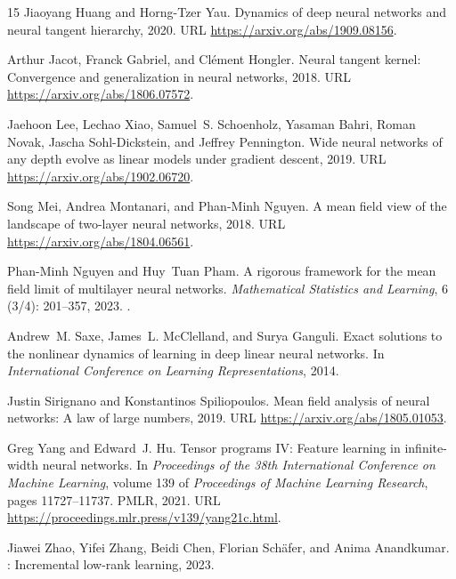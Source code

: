 \documentclass[11pt]{article}
\theoremstyle{definition}
\theoremstyle{remark}
\begin{document}
\begin{thebibliography}{15}
Jiaoyang Huang and Horng-Tzer Yau.
\newblock Dynamics of deep neural networks and neural tangent hierarchy, 2020.
\newblock URL \url{https://arxiv.org/abs/1909.08156}.

Arthur Jacot, Franck Gabriel, and Cl{\'e}ment Hongler.
\newblock Neural tangent kernel: Convergence and generalization in neural
  networks, 2018.
\newblock URL \url{https://arxiv.org/abs/1806.07572}.

Jaehoon Lee, Lechao Xiao, Samuel~S. Schoenholz, Yasaman Bahri, Roman Novak,
  Jascha Sohl-Dickstein, and Jeffrey Pennington.
\newblock Wide neural networks of any depth evolve as linear models under
  gradient descent, 2019.
\newblock URL \url{https://arxiv.org/abs/1902.06720}.

Song Mei, Andrea Montanari, and Phan-Minh Nguyen.
\newblock A mean field view of the landscape of two-layer neural networks,
  2018.
\newblock URL \url{https://arxiv.org/abs/1804.06561}.

Phan-Minh Nguyen and Huy~Tuan Pham.
\newblock A rigorous framework for the mean field limit of multilayer neural
  networks.
\newblock \emph{Mathematical Statistics and Learning}, 6
  (3/4): 201--357, 2023.
\newblock {}.

Andrew~M. Saxe, James~L. McClelland, and Surya Ganguli.
\newblock Exact solutions to the nonlinear dynamics of learning in deep linear
  neural networks.
\newblock In \emph{International Conference on Learning Representations}, 2014.

Justin Sirignano and Konstantinos Spiliopoulos.
\newblock Mean field analysis of neural networks: A law of large numbers, 2019.
\newblock URL \url{https://arxiv.org/abs/1805.01053}.

Greg Yang and Edward~J. Hu.
\newblock Tensor programs {IV}: Feature learning in infinite-width neural
  networks.
\newblock In \emph{Proceedings of the 38th International Conference on Machine
  Learning}, volume 139 of \emph{Proceedings of Machine Learning Research},
  pages 11727--11737. PMLR, 2021.
\newblock URL \url{https://proceedings.mlr.press/v139/yang21c.html}.

Jiawei Zhao, Yifei Zhang, Beidi Chen, Florian Sch{\"a}fer, and Anima
  Anandkumar.
: Incremental low-rank learning, 2023.

\end{thebibliography}
\end{document}
